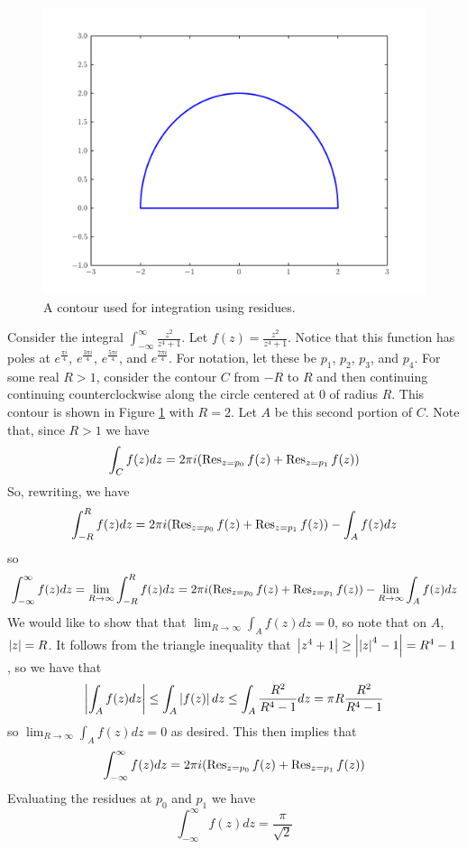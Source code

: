 \begin{figure}
\includegraphics[width=\textwidth]{contour1.pdf}
\caption{A contour used for integration using residues.}
\label{complexint:c1}
\end{figure}

Consider the integral $\int_{-\infty}^{\infty}\frac{z^2}{z^4+1}$. Let $f(z)=\frac{z^2}{z^4+1}$.
Notice that this function has poles at $e^{\frac{\pi i}{4}}$, $e^{\frac{3\pi i}{4}}$, $e^{\frac{5\pi i}{4}}$, and $e^{\frac{7\pi i}{4}}$.
For notation, let these be $p_1$, $p_2$, $p_3$, and $p_4$.
For some real $R>1$, consider the contour $C$ from $-R$ to $R$ and then continuing continuing counterclockwise along the circle centered at $0$ of radius $R$.
This contour is shown in Figure \ref{complexint:c1} with $R = 2$.
Let $A$ be this second portion of $C$.
Note that, since $R>1$ we have
\begin{equation*}
\int_C f(z)dz = 2\pi i (\operatorname{Res}_{z=p_0} f(z) +\operatorname{Res}_{z=p_1} f(z))
\end{equation*}
So, rewriting, we have
\begin{equation*}
\int_{-R}^R f(z) dz = 2\pi i (\operatorname{Res}_{z=p_0} f(z) +\operatorname{Res}_{z=p_1} f(z)) - \int_A f(z) dz
\end{equation*}
so
\begin{equation*}
\int_{-\infty}^{\infty} f(z) dz = \lim_{R\to \infty} \int_{-R}^R f(z) dz = 2\pi i (\operatorname{Res}_{z=p_0} f(z) +\operatorname{Res}_{z=p_1} f(z)) - \lim_{R\to \infty} \int_A f(z) dz
\end{equation*}
We would like to show that that $\lim_{R\to\infty} \int_A f(z) dz = 0$, so note that on $A$, $\left\lvert z\right\rvert=R$.
It follows from the triangle inequality that $\left\lvert z^4+1\right\rvert\geq \left\lvert\left\lvert z\right\rvert^4-1\right\rvert = R^4 -1$, so we have that 
$$\left\lvert\int_A f(z) dz\right\rvert\leq \int_A \left\lvert f(z)\right\rvert dz \leq \int_A \frac{R^2}{R^4 -1}dz = \pi R \frac{R^2}{R^4-1}$$
so $\lim_{R\to\infty} \int_A f(z) dz = 0$ as desired.
This then implies that 
\begin{equation*}
 \int_{-\infty}^{\infty} f(z) dz = 2\pi i (\operatorname{Res}_{z=p_0} f(z) +\operatorname{Res}_{z=p_1} f(z))
\end{equation*}
Evaluating the residues at $p_0$ and $p_1$ we have
$$\int_{-\infty}^{\infty} f(z) dz = \frac{\pi}{\sqrt{2}}$$

